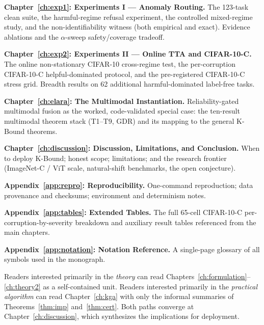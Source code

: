 \medskip
\noindent\textbf{Chapter~\ref{ch:exp1}: Experiments I --- Anomaly Routing.}
The 123-task clean suite, the harmful-regime refusal experiment, the controlled
mixed-regime study, and the non-identifiability witness (both empirical and exact).
Evidence ablations and the $\alpha$-sweep safety/coverage tradeoff.

\medskip
\noindent\textbf{Chapter~\ref{ch:exp2}: Experiments II --- Online TTA and CIFAR-10-C.}
The online non-stationary CIFAR-10 cross-regime test, the per-corruption CIFAR-10-C
helpful-dominated protocol, and the pre-registered CIFAR-10-C stress grid.
Breadth results on 62 additional harmful-dominated label-free tasks.

\medskip
\noindent\textbf{Chapter~\ref{ch:elara}: The Multimodal Instantiation.}
Reliability-gated multimodal fusion as the worked, code-validated special case:
the ten-result multimodal theorem stack (T1--T9, GDR) and its mapping to the general
K-Bound theorems.

\medskip
\noindent\textbf{Chapter~\ref{ch:discussion}: Discussion, Limitations, and Conclusion.}
When to deploy K-Bound; honest scope; limitations; and the research frontier
(ImageNet-C / ViT scale, natural-shift benchmarks, the open conjecture).

\medskip
\noindent\textbf{Appendix~\ref{app:repro}: Reproducibility.}
One-command reproduction; data provenance and checksums; environment and
determinism notes.

\medskip
\noindent\textbf{Appendix~\ref{app:tables}: Extended Tables.}
The full 65-cell CIFAR-10-C per-corruption-by-severity breakdown and
auxiliary result tables referenced from the main chapters.

\medskip
\noindent\textbf{Appendix~\ref{app:notation}: Notation Reference.}
A single-page glossary of all symbols used in the monograph.

\medskip\noindent
Readers interested primarily in the \emph{theory} can read
Chapters~\ref{ch:formulation}--\ref{ch:theory2} as a self-contained unit.
Readers interested primarily in the \emph{practical algorithm} can read
Chapter~\ref{ch:kga} with only the informal summaries of
Theorems~\ref{thm:imp} and~\ref{thm:cert}.
Both paths converge at Chapter~\ref{ch:discussion}, which synthesizes the
implications for deployment.

